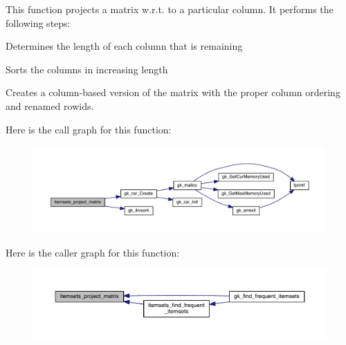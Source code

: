 This function projects a matrix w.\+r.\+t. to a particular column. It performs the following steps\+:
\begin{DoxyItemize}
\item Determines the length of each column that is remaining
\item Sorts the columns in increasing length
\item Creates a column-\/based version of the matrix with the proper column ordering and renamed rowids. 
\end{DoxyItemize}Here is the call graph for this function\+:\nopagebreak
\begin{figure}[H]
\begin{center}
\leavevmode
\includegraphics[width=350pt]{a00104_ab348ad8f89d70692400d7602e3a824bf_cgraph}
\end{center}
\end{figure}
Here is the caller graph for this function\+:\nopagebreak
\begin{figure}[H]
\begin{center}
\leavevmode
\includegraphics[width=350pt]{a00104_ab348ad8f89d70692400d7602e3a824bf_icgraph}
\end{center}
\end{figure}
